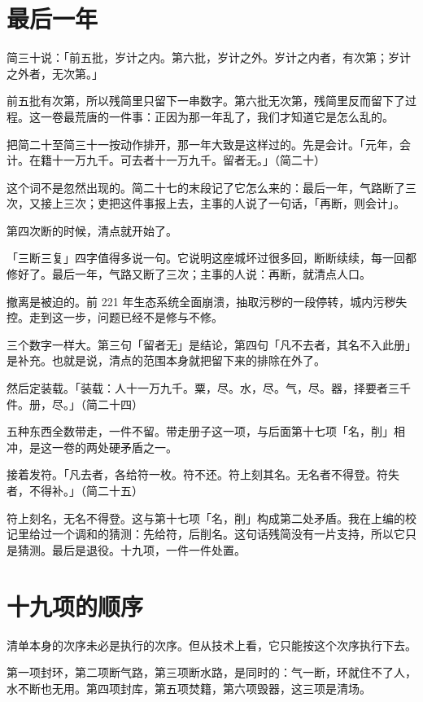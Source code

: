 \section{最后一年}

简三十说：「前五批，岁计之内。第六批，岁计之外。岁计之内者，有次第；岁计之外者，无次第。」

前五批有次第，所以残简里只留下一串数字。第六批无次第，残简里反而留下了过程。这一卷最荒唐的一件事：正因为那一年乱了，我们才知道它是怎么乱的。

把简二十至简三十一按动作排开，那一年大致是这样过的。先是会计。「元年，会计。在籍十一万九千。可去者十一万九千。留者无。」（简二十）

这个词不是忽然出现的。简二十七的末段记了它怎么来的：最后一年，气路断了三次，又接上三次；吏把这件事报上去，主事的人说了一句话，「再断，则会计」。\par
第四次断的时候，清点就开始了。\par
「三断三复」四字值得多说一句。它说明这座城坏过很多回，断断续续，每一回都修好了。最后一年，气路又断了三次；主事的人说：再断，就清点人口。

撤离是被迫的。前 221 年生态系统全面崩溃，抽取污秽的一段停转，城内污秽失控。走到这一步，问题已经不是修与不修。

三个数字一样大。第三句「留者无」是结论，第四句「凡不去者，其名不入此册」是补充。也就是说，清点的范围本身就把留下来的排除在外了。

然后定装载。「装载：人十一万九千。粟，尽。水，尽。气，尽。器，择要者三千件。册，尽。」（简二十四）

五种东西全数带走，一件不留。带走册子这一项，与后面第十七项「名，削」相冲，是这一卷的两处硬矛盾之一。

接着发符。「凡去者，各给符一枚。符不还。符上刻其名。无名者不得登。符失者，不得补。」（简二十五）

符上刻名，无名不得登。这与第十七项「名，削」构成第二处矛盾。我在上编的校记里给过一个调和的猜测：先给符，后削名。这句话残简没有一片支持，所以它只是猜测。最后是退役。十九项，一件一件处置。

\section{十九项的顺序}

清单本身的次序未必是执行的次序。但从技术上看，它只能按这个次序执行下去。

第一项封环，第二项断气路，第三项断水路，是同时的：气一断，环就住不了人，水不断也无用。第四项封库，第五项焚籍，第六项毁器，这三项是清场。

